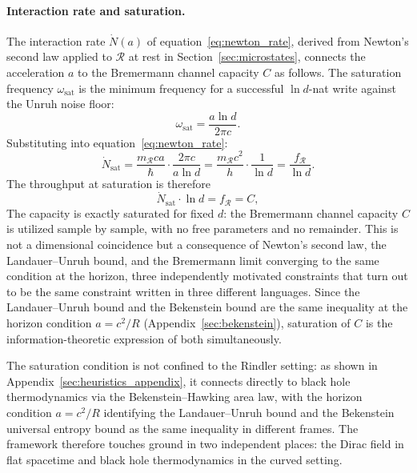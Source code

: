 \documentclass[12pt,a4paper]{article}
\begin{document}
\paragraph{Interaction rate and saturation.}
The interaction rate $\dot{N}(a)$ of 
equation~\eqref{eq:newton_rate}, derived from 
Newton's second law applied to $\mathcal{R}$ at 
rest in Section~\ref{sec:microstates}, connects 
the acceleration $a$ to the Bremermann channel 
capacity $C$ as follows. The saturation 
frequency $\omega_{\mathrm{sat}}$ is the minimum 
frequency for a successful $\ln d$-nat write against 
the Unruh noise floor:
\begin{equation}
    \omega_{\mathrm{sat}} = \frac{a\ln d}{2\pi c}.
\label{eq:omega_sat}
\end{equation}
Substituting into equation~\eqref{eq:newton_rate}:
\begin{equation}
    \dot{N}_{\mathrm{sat}} 
    = \frac{m_{\mathcal{R}}ca}{\hbar} 
      \cdot \frac{2\pi c}{a\ln d} 
    = \frac{m_{\mathcal{R}}c^2}{h} \cdot \frac{1}{\ln d}
    = \frac{f_{\mathcal{R}}}{\ln d}.
\label{eq:Nsat}
\end{equation}
The throughput at saturation is therefore
\begin{equation}
    \dot{N}_{\mathrm{sat}} \cdot \ln d 
    = f_{\mathcal{R}} = C,
\label{eq:saturation}
\end{equation}
The capacity is exactly saturated for fixed $d$: the 
Bremermann channel capacity $C$ is utilized sample by 
sample, with no free parameters and no remainder.
This is not a 
dimensional coincidence but a consequence of 
Newton's second law, the Landauer--Unruh bound, 
and the Bremermann limit converging to the same 
condition at the horizon, three independently 
motivated constraints that turn out to be the same 
constraint written in three different languages.
Since the Landauer--Unruh bound and the Bekenstein bound 
are the same inequality at the horizon condition $a = c^2/R$ 
(Appendix~\ref{sec:bekenstein}), saturation of $C$ is 
the information-theoretic expression of both simultaneously.

The saturation condition is not confined to the Rindler 
setting: as shown in Appendix~\ref{sec:heuristics_appendix}, 
it connects directly to black hole thermodynamics via the 
Bekenstein--Hawking area law, with the horizon condition 
$a = c^2/R$ identifying the Landauer--Unruh bound and the 
Bekenstein universal entropy bound as the same inequality 
in different frames. The framework therefore touches ground 
in two independent places: the Dirac field in flat spacetime 
and black hole thermodynamics in the curved setting.
\end{document}
